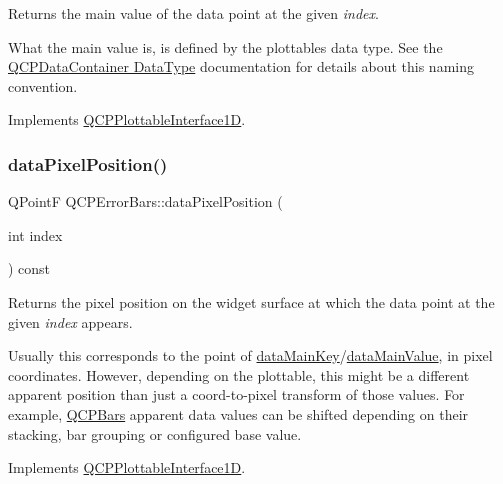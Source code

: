Returns the main value of the data point at the given {\itshape index}.

What the main value is, is defined by the plottable\textquotesingle{}s data type. See the \hyperlink{class_q_c_p_data_container_qcpdatacontainer-datatype}{Q\+C\+P\+Data\+Container Data\+Type} documentation for details about this naming convention. 

Implements \hyperlink{class_q_c_p_plottable_interface1_d_af6330919e8023277d08c958a6074fc76}{Q\+C\+P\+Plottable\+Interface1D}.

\mbox{\label{class_q_c_p_error_bars_a7397bc40751c9c6e2ea188895b2152f8}} 
\subsubsection{\texorpdfstring{data\+Pixel\+Position()}{dataPixelPosition()}}
{\footnotesize\ttfamily Q\+PointF Q\+C\+P\+Error\+Bars\+::data\+Pixel\+Position (\begin{DoxyParamCaption}\item[{int}]{index }\end{DoxyParamCaption}) const\hspace{0.3cm}{\ttfamily [virtual]}}

Returns the pixel position on the widget surface at which the data point at the given {\itshape index} appears.

Usually this corresponds to the point of \hyperlink{class_q_c_p_error_bars_ae3931213f76cd34a824c42c22a1dca74}{data\+Main\+Key}/\hyperlink{class_q_c_p_error_bars_a88cd90280366b44c2159774bfb7c473a}{data\+Main\+Value}, in pixel coordinates. However, depending on the plottable, this might be a different apparent position than just a coord-\/to-\/pixel transform of those values. For example, \hyperlink{class_q_c_p_bars}{Q\+C\+P\+Bars} apparent data values can be shifted depending on their stacking, bar grouping or configured base value. 

Implements \hyperlink{class_q_c_p_plottable_interface1_d_a78911838cfbcfd2d8df9ad2fdbfb8e93}{Q\+C\+P\+Plottable\+Interface1D}.

\mbox{\label{class_q_c_p_error_bars_a1ef91328ad7dde84695958139d5f40cf}} 
